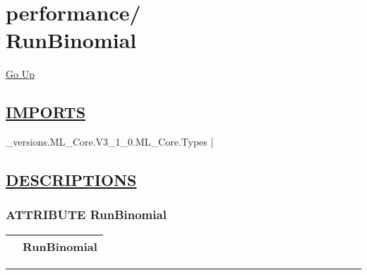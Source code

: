 \chapter*{\color{headfile}
{\large performance\slash\hspace{0pt}}
 \\
RunBinomial
}
\hypertarget{ecldoc:toc:performance.RunBinomial}{}
\hyperlink{ecldoc:toc:root/performance}{Go Up}

\section*{\underline{\textsf{IMPORTS}}}
\begin{doublespace}
{\large
\_versions.ML\_Core.V3\_1\_0.ML\_Core.Types |
}
\end{doublespace}

\section*{\underline{\textsf{DESCRIPTIONS}}}
\subsection*{\textsf{\colorbox{headtoc}{\color{white} ATTRIBUTE}
RunBinomial}}

\hypertarget{ecldoc:performance.runbinomial}{}

{\renewcommand{\arraystretch}{1.5}
\begin{tabularx}{\textwidth}{|>{\raggedright\arraybackslash}l|X|}
\hline
\hspace{0pt}\mytexttt{\color{red} } & \textbf{RunBinomial} \\
\hline
\end{tabularx}
}

\par


\rule{\linewidth}{0.5pt}
